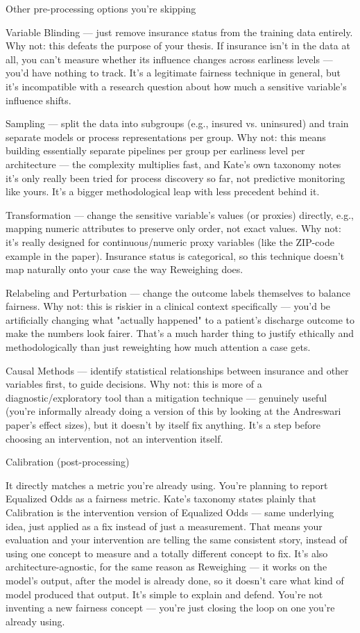 \documentclass[authoryear,preprint,12pt]{elsarticle}
\begin{document}
Other pre-processing options you're skipping

Variable Blinding — just remove insurance status from the training data entirely.
Why not: this defeats the purpose of your thesis. If insurance isn't in the data at all, you can't measure whether its influence changes across earliness levels — you'd have nothing to track. It's a legitimate fairness technique in general, but it's incompatible with a research question about how much a sensitive variable's influence shifts.

Sampling — split the data into subgroups (e.g., insured vs. uninsured) and train separate models or process representations per group.
Why not: this means building essentially separate pipelines per group per earliness level per architecture — the complexity multiplies fast, and Kate's own taxonomy notes it's only really been tried for process discovery so far, not predictive monitoring like yours. It's a bigger methodological leap with less precedent behind it.

Transformation — change the sensitive variable's values (or proxies) directly, e.g., mapping numeric attributes to preserve only order, not exact values.
Why not: it's really designed for continuous/numeric proxy variables (like the ZIP-code example in the paper). Insurance status is categorical, so this technique doesn't map naturally onto your case the way Reweighing does.

Relabeling and Perturbation — change the outcome labels themselves to balance fairness.
Why not: this is riskier in a clinical context specifically — you'd be artificially changing what "actually happened" to a patient's discharge outcome to make the numbers look fairer. That's a much harder thing to justify ethically and methodologically than just reweighting how much attention a case gets.

Causal Methods — identify statistical relationships between insurance and other variables first, to guide decisions.
Why not: this is more of a diagnostic/exploratory tool than a mitigation technique — genuinely useful (you're informally already doing a version of this by looking at the Andreswari paper's effect sizes), but it doesn't by itself fix anything. It's a step before choosing an intervention, not an intervention itself.

Calibration (post-processing)

It directly matches a metric you're already using. You're planning to report Equalized Odds as a fairness metric. Kate's taxonomy states plainly that Calibration is the intervention version of Equalized Odds — same underlying idea, just applied as a fix instead of just a measurement. That means your evaluation and your intervention are telling the same consistent story, instead of using one concept to measure and a totally different concept to fix.
It's also architecture-agnostic, for the same reason as Reweighing — it works on the model's output, after the model is already done, so it doesn't care what kind of model produced that output.
It's simple to explain and defend. You're not inventing a new fairness concept — you're just closing the loop on one you're already using.
\end{document}
